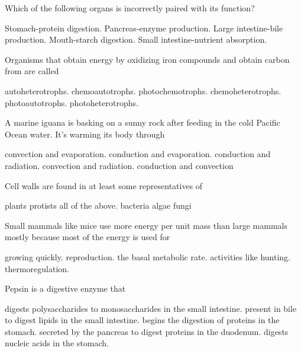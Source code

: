 \newpage

\question
Which of the following organs is incorrectly paired with its function?

\begin{choices}
\choice Stomach-protein digestion. 
\choice Pancreas-enzyme production. 
\correctchoice Large intestine-bile production. 
\choice Mouth-starch digestion. 
\choice Small intestine-nutrient absorption. 
\end{choices}

\question
Organisms that obtain energy by oxidizing iron compounds and obtain carbon from  are called

\begin{choices}
\choice autoheterotrophs. 
\correctchoice chemoautotrophs. 
\choice photochemotrophs. 
\choice chemoheterotrophs. 
\choice photoautotrophs. 
\choice photoheterotrophs. 
\end{choices}

\question
A marine iguana is basking on a sunny rock after feeding in the cold Pacific Ocean water. It's warming its body through 

\begin{choices}
\choice convection and evaporation. 
\choice conduction and evaporation. 
\correctchoice conduction and radiation. 
\choice convection and radiation.  
\choice conduction and convection 
\end{choices}

\question
Cell walls are found in at least some representatives of  
\begin{choices}
\choice plants 
\choice protists 
\correctchoice all of the above.  
\choice bacteria 
\choice algae 
\choice fungi 
\end{choices}

\question
Small mammals like mice use more energy per unit mass than large mammals mostly because most of the energy is used for

\begin{choices}
\choice growing quickly. 
\choice reproduction. 
\choice the basal metabolic rate. 
\choice activities like hunting. 
\correctchoice thermoregulation. 
\end{choices}

\newpage

\question
Pepsin is a digestive enzyme that

\begin{choices}
\choice digests polysaccharides to monosaccharides in the small intestine. 
\choice present in bile to digest lipids in the small intestine. 
\correctchoice begins the digestion of proteins in the stomach. 
\choice secreted by the pancreas to digest proteins in the duodenum. 
\choice digests nucleic acids in the stomach. 
\end{choices}

